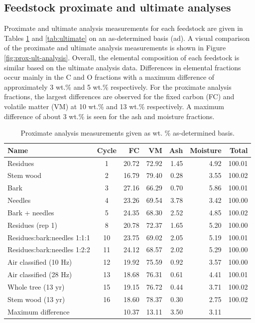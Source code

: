 \documentclass[12pt,titlepage]{article}
\begin{document}
\subsection{Feedstock proximate and ultimate analyses}

Proximate and ultimate analysis measurements for each feedstock are given in Tables \ref{tab:proximate} and \ref{tab:ultimate} on an as-determined basis (ad). A visual comparison of the proximate and ultimate analysis measurements is shown in Figure \ref{fig:prox-ult-analysis}. Overall, the elemental composition of each feedstock is similar based on the ultimate analysis data. Differences in elemental fractions occur mainly in the C and O fractions with a maximum difference of approximately 3 wt.\% and 5 wt.\% respectively. For the proximate analysis fractions, the largest differences are observed for the fixed carbon (FC) and volatile matter (VM) at 10 wt.\% and 13 wt.\% respectively. A maximum difference of about 3 wt.\% is seen for the ash and moisture fractions.

\begin{table}[H]
    \caption{Proximate analysis measurements given as wt. \% as-determined basis.}
    \label{tab:proximate}
    \centering
    \begin{tabular}{lcrrrrr}
        \toprule
        Name & Cycle & FC & VM & Ash & Moisture & Total \\
        \midrule
        Residues                    & 1  & 20.72 & 72.92 & 1.45 & 4.92 & 100.01 \\
        Stem wood                   & 2  & 16.79 & 79.40 & 0.28 & 3.55 & 100.02 \\
        Bark                        & 3  & 27.16 & 66.29 & 0.70 & 5.86 & 100.01 \\
        Needles                     & 4  & 23.26 & 69.54 & 3.78 & 3.42 & 100.00 \\
        Bark + needles              & 5  & 24.35 & 68.30 & 2.52 & 4.85 & 100.02 \\
        Residues (rep 1)            & 8  & 20.78 & 72.37 & 1.65 & 5.20 & 100.00 \\
        Residues:bark:needles 1:1:1 & 10 & 23.75 & 69.02 & 2.05 & 5.19 & 100.01 \\
        Residues:bark:needles 1:2:2 & 11 & 24.12 & 68.57 & 2.02 & 5.29 & 100.00 \\
        Air classified (10 Hz)      & 12 & 19.92 & 75.59 & 0.92 & 3.57 & 100.00 \\
        Air classified (28 Hz)      & 13 & 18.68 & 76.31 & 0.61 & 4.41 & 100.01 \\
        Whole tree (13 yr)          & 15 & 19.15 & 76.72 & 0.44 & 3.71 & 100.02 \\
        Stem wood (13 yr)           & 16 & 18.60 & 78.37 & 0.30 & 2.75 & 100.02 \\
        \cmidrule{3-6}
        \multicolumn{2}{l}{Maximum difference} & 10.37 & 13.11 & 3.50 & 3.11 & \\
        \bottomrule
    \end{tabular}
\end{table}
\end{document}
